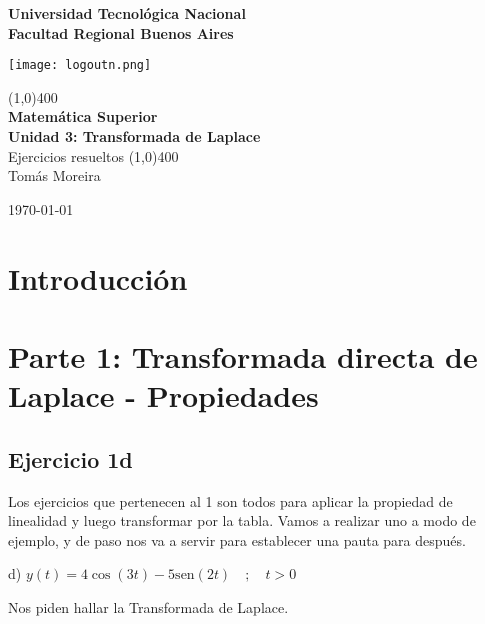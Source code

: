 \documentclass[11pt]{article}
\def\sen{\mathrm{sen}}
\begin{document}
		
	\begin{titlepage}
		\begin{center}
			\vspace*{0.5cm}
			\Large{\textbf{Universidad Tecnológica Nacional}}\\
			\Large{\textbf{Facultad Regional Buenos Aires}}\\
			\begin{center}
				\texttt{[image: logoutn.png]}
			\end{center}
			\vfill
			\line(1,0){400}\\
			\vspace*{0.3cm}
			\huge{\textbf{Matemática Superior}}\\
			\Large{\textbf{Unidad 3: Transformada de Laplace}}\\
			\large{Ejercicios resueltos}
			\line(1,0){400}\\
			\vfill
			Tomás Moreira \\
			
			
			\today
				
				
		\end{center}
	\end{titlepage}

	\tableofcontents
	\thispagestyle{empty}
	\clearpage

	\setcounter{page}{1}
	\section{Introducción}
	\section{Parte 1: Transformada directa de Laplace - Propiedades}
	\subsection{Ejercicio 1d}
	Los ejercicios que pertenecen al 1 son todos para aplicar la propiedad de linealidad y luego transformar por la tabla. Vamos a realizar uno a modo de ejemplo, y de paso nos va a servir para establecer una pauta para después.
	
	d) $y(t)=4\cos(3t)-5\sen(2t)\quad;\quad t>0$
	
	Nos piden hallar la Transformada de Laplace.
	
\end{document}
